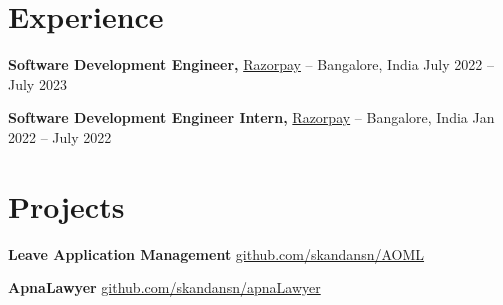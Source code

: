 \vspace{-6.5pt}

\section*{Experience}
\textbf{Software Development Engineer,} \href{https://razorpay.com/}{Razorpay} -- Bangalore, India \hfill July 2022 -- July 2023 \\
\vspace{-9pt}
\begin{itemize}
  \label{sde}
  
\end{itemize}

\textbf{Software Development Engineer Intern,} \href{https://razorpay.com/}{Razorpay} -- Bangalore, India \hfill Jan 2022 -- July 2022 \\
\vspace{-9pt}
\begin{itemize}
  \label{sdei}

\end{itemize}


\vspace{-18.5pt}

\section*{Projects}
\textbf{Leave Application Management} \hfill \href{https://github.com/skandansn/AOML}
{github.com/skandansn/AOML} \\
\vspace{-9pt}
\begin{itemize}
  \label{projects1}

\end{itemize}

\textbf{ApnaLawyer} \hfill \href{https://github.com/skandansn/apnaLawyer}
{github.com/skandansn/apnaLawyer} \\
\vspace{-9pt}
\begin{itemize}
  \label{projects2}

\end{itemize}

\vspace{-18.5pt}


